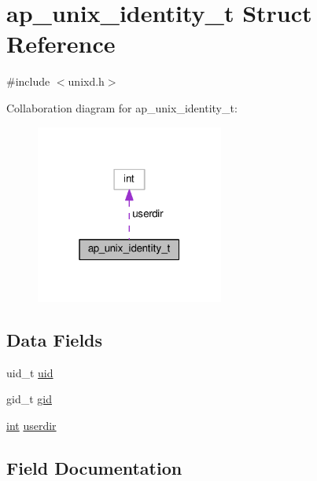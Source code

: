 \hypertarget{structap__unix__identity__t}{}\section{ap\+\_\+unix\+\_\+identity\+\_\+t Struct Reference}
\label{structap__unix__identity__t}


{\ttfamily \#include $<$unixd.\+h$>$}



Collaboration diagram for ap\+\_\+unix\+\_\+identity\+\_\+t\+:
\nopagebreak
\begin{figure}[H]
\begin{center}
\leavevmode
\includegraphics[width=175pt]{structap__unix__identity__t__coll__graph}
\end{center}
\end{figure}
\subsection*{Data Fields}
\begin{DoxyCompactItemize}
\item 
uid\+\_\+t \hyperlink{structap__unix__identity__t_a2fe615ce1c1aebd146fe018793be5d71}{uid}
\item 
gid\+\_\+t \hyperlink{structap__unix__identity__t_ac9d744a0881d60fd6161412fe6e9f914}{gid}
\item 
\hyperlink{pcre_8txt_a42dfa4ff673c82d8efe7144098fbc198}{int} \hyperlink{structap__unix__identity__t_ac206549468b554b578a2cc047322b25e}{userdir}
\end{DoxyCompactItemize}


\subsection{Field Documentation}
